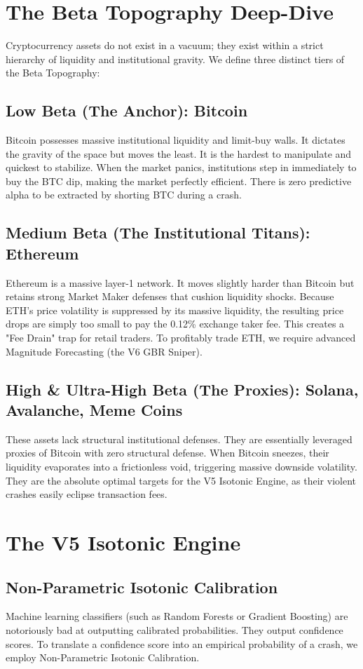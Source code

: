 \documentclass[11pt,a4paper]{report}
\begin{document}
\chapter{The Beta Topography Deep-Dive}
Cryptocurrency assets do not exist in a vacuum; they exist within a strict hierarchy of liquidity and institutional gravity. We define three distinct tiers of the Beta Topography:

\section{Low Beta (The Anchor): Bitcoin}
Bitcoin possesses massive institutional liquidity and limit-buy walls. It dictates the gravity of the space but moves the least. It is the hardest to manipulate and quickest to stabilize. When the market panics, institutions step in immediately to buy the BTC dip, making the market perfectly efficient. There is zero predictive alpha to be extracted by shorting BTC during a crash.

\section{Medium Beta (The Institutional Titans): Ethereum}
Ethereum is a massive layer-1 network. It moves slightly harder than Bitcoin but retains strong Market Maker defenses that cushion liquidity shocks. Because ETH's price volatility is suppressed by its massive liquidity, the resulting price drops are simply too small to pay the 0.12\% exchange taker fee. This creates a "Fee Drain" trap for retail traders. To profitably trade ETH, we require advanced Magnitude Forecasting (the V6 GBR Sniper).

\section{High \& Ultra-High Beta (The Proxies): Solana, Avalanche, Meme Coins}
These assets lack structural institutional defenses. They are essentially leveraged proxies of Bitcoin with zero structural defense. When Bitcoin sneezes, their liquidity evaporates into a frictionless void, triggering massive downside volatility. They are the absolute optimal targets for the V5 Isotonic Engine, as their violent crashes easily eclipse transaction fees.

\chapter{The V5 Isotonic Engine}
\section{Non-Parametric Isotonic Calibration}
Machine learning classifiers (such as Random Forests or Gradient Boosting) are notoriously bad at outputting calibrated probabilities. They output confidence scores. To translate a confidence score into an empirical probability of a crash, we employ Non-Parametric Isotonic Calibration.
\end{document}
